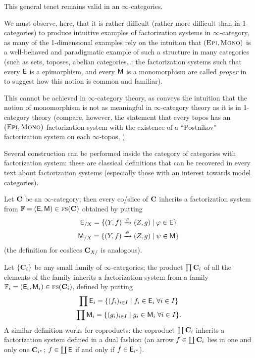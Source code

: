 This general tenet remains valid in an $\infty$\hyp{}categories.
\begin{remark}\label{no.easy.examples}
We must observe, here, that it is rather difficult (\ie rather more difficult than in 1\hyp{}categories) to produce intuitive examples of factorization systems in $\infty$\hyp{}category, as many of the 1\hyp{}dimensional examples rely on the intuition that $(\text{\scshape Epi}, \text{\scshape Mono})$ is a well\hyp{}behaved and paradigmatic example of such a structure in many categories (such as sets, toposes, abelian categories\dots: the factorization systems such that every $\mathsf{E}$ is a epimorphism, and every $\mathsf{M}$ is a monomorphism are called \emph{proper} in \cite{FK,kelly1980unified} to suggest how this notion is common and familiar).

This cannot be achieved in $\infty$\hyp{}category theory, as \cite[p. 562]{HTT} conveys the intuition that the notion of monomorphism is not as meaningful in $\infty$\hyp{}category theory as it is in 1\hyp{}category theory (compare, however, the statement that every topos has an $(\text{\scshape Epi}, \text{\scshape Mono})$\hyp{}factorization system with the existence of a ``Postnikov'' factorization system on each $\infty$\hyp{}topos, \cite{HTT}).
\end{remark}
Several construction can be performed inside the category of categories with factorization system: these are classical definitions that can be recovered in every text about factorization systems (especially those with an interest towards model categories).
\begin{example}\label{prod.of.fact}
Let $\mathbf{C}$ be an $\infty$\hyp{}category; then every co\fshyp{}slice of $\mathbf{C}$ inherits a factorization system from $\mathbb{F} = (\mathsf{E},\mathsf{M})\in\text{\scshape fs}(\mathbf{C})$ obtained by putting
\begin{gather}
\mathsf{E}_{/X} = \{(Y,f) \xrightarrow{\varphi}(Z,g)\mid \varphi \in \mathsf{E} \}\notag\\
\mathsf{M}_{/X} = \{(Y,f)\xrightarrow{\psi}(Z,g)\mid \psi \in \mathsf{M} \}
\end{gather}
(the definition for coslices $\mathbf{C}_{X/}$ is analogous).

Let $\{\mathbf{C}_i\}$ be any small family of $\infty$\hyp{}categories; the product $\prod \mathbf{C}_i$ of all the elements of the family inherits a factorization system from a family $\mathbb{F}_i = (\mathsf{E}_i,\mathsf{M}_i)\in\text{\scshape fs}(\mathbf{C}_i)$, defined by putting
\begin{gather}
\prod \mathsf{E}_i = \{ (f_i)_{i\in I}\mid f_i\in\mathsf{E}_i\; \forall i\in I \}\notag\\
\prod \mathsf{M}_i = \{ (g_i)_{i\in I}\mid g_i\in\mathsf{M}_i\; \forall i\in I \}.
\end{gather}
A similar definition works for coproducts: the coproduct $\coprod \mathbf{C}_i$ inherits a factorization system defined in a dual fashion (an arrow $f\in\coprod \mathbf{C}_i$ lies in one and only one $\mathbf{C}_{i^*}$; $f\in\coprod \mathsf{E}$ if and only if $f\in \mathsf{E}_{i^*}$).
\end{example}
